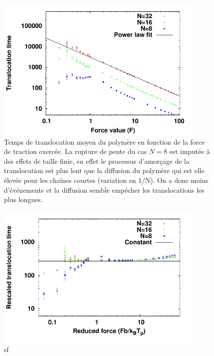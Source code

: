 \documentclass[a4paper,11pt]{article}
\begin{document}
\begin{figure}[H]
\begin{center}
\includegraphics[width=0.9\textwidth]{translocholebigger.pdf} 
\caption{Temps de translocation moyen du polymère en fonction de la force de traction exercée. La rupture de pente du cas $N=8$ est imputée à des effets de taille finie, en effet le processus d'amorçage de la translocation est plus lent que la diffusion du polymère qui est elle élevée pour les chaînes courtes (variation en 1/N). On a donc moins d'événements et la diffusion semble empécher les translocations les plus longues. }
\label{holebiggertau}
\end{center}
\end{figure}



\begin{figure}[H]
\begin{center}
\includegraphics[width=0.9\textwidth]{transloctaufrescholebigger.pdf} 
\caption{sf}
\label{holebiggerescale}
\end{center}
\end{figure}
\end{document}
